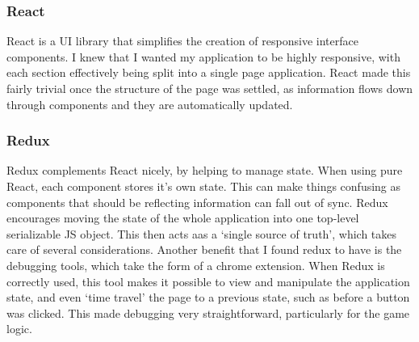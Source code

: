 \subsubsection{React}
React\cite{React} is a UI library that simplifies the creation of responsive interface components. I knew that I wanted my application to be highly responsive, with each section effectively being split into a single page application. React made this fairly trivial once the structure of the page was settled, as information flows down through components and they are automatically updated.

\subsubsection{Redux}
Redux\cite{Redux} complements React nicely, by helping to manage state. When using pure React, each component stores it's own state. This can make things confusing as components that should be reflecting information can fall out of sync. Redux encourages moving the state of the whole application into one top-level serializable JS object. This then acts aas a `single source of truth', which takes care of several considerations. Another benefit that I found redux to have is the debugging tools, which take the form of a chrome extension\cite{ReduxDev}. When Redux is correctly used, this tool makes it possible to view and manipulate the application state, and even `time travel' the page to a previous state, such as before a button was clicked. This made debugging very straightforward, particularly for the game logic.

